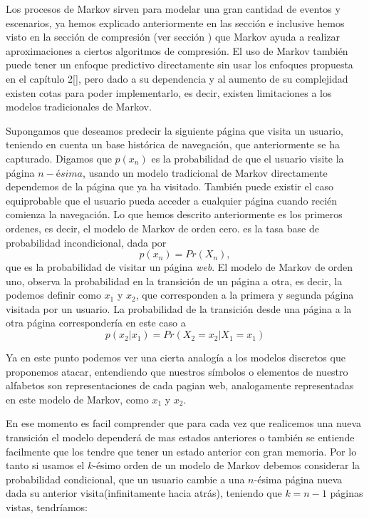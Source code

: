 
Los procesos de Markov sirven para modelar una gran cantidad de eventos y escenarios, ya hemos explicado anteriormente en las sección  e inclusive hemos visto en la sección de compresión (ver sección ) que Markov ayuda a realizar aproximaciones a ciertos algoritmos de compresión. El uso de Markov también puede tener un enfoque predictivo directamente sin usar los enfoques propuesta en el capítulo 2\ref{}, pero dado a su dependencia y al aumento de su complejidad existen cotas para poder implementarlo, es decir, existen limitaciones a los modelos tradicionales de Markov.

Supongamos que deseamos predecir la siguiente página que visita un usuario, teniendo en cuenta un base histórica de navegación, que anteriormente se ha capturado. Digamos que $p(x_{n})$ es la probabilidad de que el usuario visite la página $n-ésima$, usando un modelo tradicional de Markov directamente dependemos de la página que ya ha visitado. También puede existir el caso equiprobable que el usuario pueda acceder a cualquier página cuando recién comienza la navegación. Lo que hemos descrito anteriormente es los primeros ordenes, es decir, el modelo de Markov de orden cero. es la tasa base de probabilidad incondicional, dada por \begin{equation}
p(x_{n}) = Pr(X_n) , \end{equation} que es la probabilidad de visitar un página \emph{web}. El  modelo de Markov de orden uno, observa la probabilidad en la transición de un página a otra, es decir, la podemos definir como  $x_{1}$ y $x_{2}$, que corresponden a la primera y segunda página visitada por un usuario. La probabilidad de la transición desde una página a la otra página correspondería en este caso a 
\begin{equation} 
p(x_{2} | x_1) = Pr(X_2 = x_{2} | X_1 = x_{1}) 
\end{equation}

Ya en este punto podemos ver una cierta analogía a los modelos discretos que proponemos atacar, entendiendo que nuestros símbolos o elementos de nuestro alfabetos son representaciones de cada pagian web, analogamente representadas en este modelo de Markov, como $x_{1}$ y $x_{2}$. 

En ese momento es facil comprender que para cada vez que realicemos una nueva transición el modelo dependerá de mas estados anteriores o también se entiende facilmente que los tendre que tener un estado anterior con gran memoria. Por lo tanto si usamos el $k$-ésimo orden de un modelo de Markov debemos considerar la probabilidad condicional, que un usuario cambie a una $n$-ésima página nueva dada su anterior visita(infinitamente hacia atrás), teniendo que $k = n -1$ páginas vistas, tendríamos:

